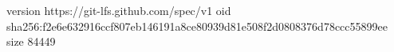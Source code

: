version https://git-lfs.github.com/spec/v1
oid sha256:f2e6e632916ccf807eb146191a8ce80939d81e508f2d0808376d78ccc55899ee
size 84449

